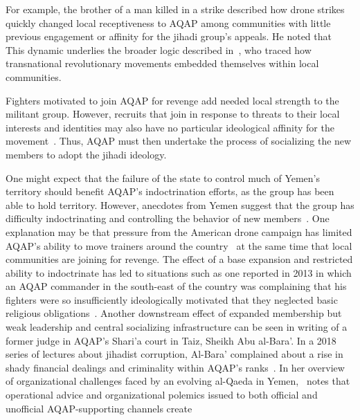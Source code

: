 For example, the brother of a man killed in a strike described how drone strikes quickly changed local receptiveness to AQAP among communities with little previous
engagement or affinity for the jihadi group's appeals. He noted that ~\autocite{reuters2013yemen}  This dynamic
underlies the broader logic described
in~\textcite{kilcullen2009accidental}, who traced how transnational
revolutionary movements embedded themselves within local
communities. 

Fighters motivated to join AQAP for revenge add needed local strength to the militant group. However, recruits that join in response to threats to their local interests and identities may also have no particular ideological affinity for the movement~\autocite{johnsen2013lost, schubiger2018one}. Thus, AQAP must then undertake the process of socializing the new members to adopt the jihadi ideology. 

One might expect that the failure of the state to control much of Yemen's territory should benefit AQAP's indoctrination efforts, as the group has been able to hold territory. However, anecdotes from Yemen suggest that the group has difficulty
indoctrinating and controlling the behavior of new members~\autocite{kendall2018contemporary}. One explanation may be that pressure from the American drone campaign has limited AQAP's ability to move trainers around the country~\autocite{reuters2013yemen} at the same time that
local communities are joining for revenge. The effect of a base
expansion and restricted ability to indoctrinate has led to
situations such as one reported in 2013 in which an AQAP commander in
the south-east of the country was complaining that his fighters were
so insufficiently ideologically motivated that they neglected basic
religious obligations~\autocite{almuslimi2014yemenis}. Another downstream effect of expanded membership but weak leadership and central socializing infrastructure can be seen in writing of a former judge in AQAP's  Shari'a court in Taiz, Sheikh Abu al-Bara'. In a 2018 series of lectures about jihadist corruption, Al-Bara' complained about a rise in shady financial dealings and criminality within AQAP's ranks~\autocite{kendall2018contemporary}. In her overview of organizational challenges faced by an evolving al-Qaeda in Yemen,~\cite{kendall2018contemporary} notes that operational advice and organizational polemics issued to both official and unofficial AQAP-supporting channels create 

